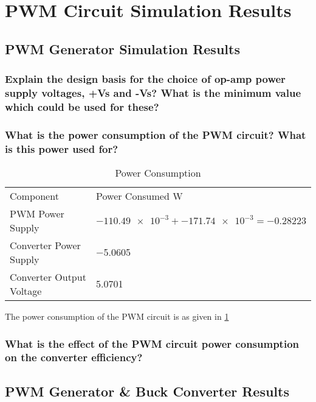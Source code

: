 \section{PWM Circuit Simulation Results}
\subsection{PWM Generator Simulation Results}
\subsubsection{Explain the design basis for the choice of op-amp power supply voltages, +Vs and -Vs? What is the minimum value which could be used for these?}

\subsubsection{What is the power consumption of the PWM circuit? What is this power used for?}
\begin{table}[h]
	\centering
	\caption{Power Consumption}
	\begin{tabular}{ll}
		\toprule
		Component&Power Consumed \si{\watt}\\
		\cmidrule(r){1-1}\cmidrule(l){2-2}
		PWM Power Supply & $\num{-110.49e-3}+\num{-171.74e-3}=\num{-0.28223}$\\
		Converter Power Supply & \num{-5.0605}\\
		Converter Output Voltage & \num{5.0701}\\
		\bottomrule
	\end{tabular}
	\label{tab:pwm power}
\end{table}
The power consumption of the PWM circuit is as given in \cref{tab:pwm power}
\subsubsection{What is the effect of the PWM circuit power consumption on the converter efficiency?}

\subsection{PWM Generator \& Buck Converter Results}

